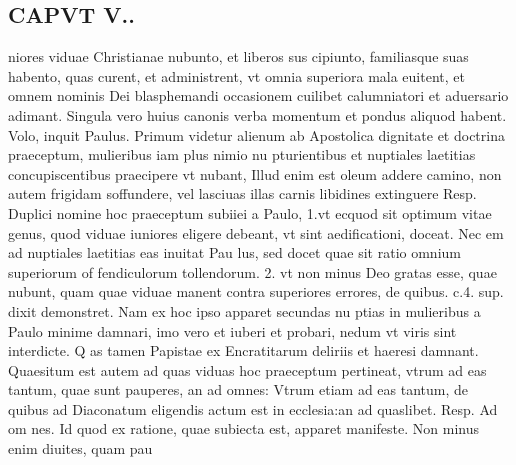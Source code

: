 \documentclass{article}
\begin{document}
\begin{pages}
\section*{CAPVT  V.. }
\marginpar{[ p.29 ]}\pstart niores viduae Christianae nubunto, et liberos sus cipiunto, familiasque suas habento, quas curent, et administrent, vt omnia superiora mala euitent, et omnem nominis Dei blasphemandi occasionem cuilibet calumniatori et aduersario adimant. Singula vero huius canonis verba momentum et pondus aliquod habent. Volo, inquit Paulus. Primum videtur alienum ab Apostolica dignitate et doctrina praeceptum, mulieribus iam plus nimio nu pturientibus et nuptiales laetitias concupiscentibus praecipere vt nubant, Illud enim est oleum addere camino, non autem frigidam soffundere, vel lasciuas illas carnis libidines extinguere Resp. Duplici nomine hoc praeceptum subiiei a Paulo, 1.vt ecquod sit optimum vitae genus, quod viduae iuniores eligere debeant, vt sint aedificationi, doceat. Nec em ad nuptiales laetitias eas inuitat Pau lus, sed docet quae sit ratio omnium superiorum of fendiculorum tollendorum. 2. vt non minus Deo gratas esse, quae nubunt, quam quae viduae manent contra superiores errores, de quibus. c.4. sup. dixit demonstret. Nam ex hoc ipso apparet secundas nu ptias in mulieribus a Paulo minime damnari, imo vero et iuberi et probari, nedum vt viris sint interdicte. Q as tamen Papistae ex Encratitarum deliriis et haeresi damnant. Quaesitum est autem ad quas viduas hoc praeceptum pertineat, vtrum ad eas tantum, quae sunt pauperes, an ad omnes: Vtrum etiam ad eas tantum, de quibus ad Diaconatum eligendis actum est in ecclesia:an ad quaslibet. Resp. Ad om nes. Id quod ex ratione, quae subiecta est, apparet manifeste. Non minus enim diuites, quam pau\pend

\end{pages}
\end{document}

